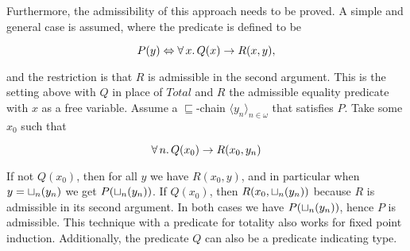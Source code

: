 Furthermore, the admissibility of this approach needs to be proved. A
simple and general case is assumed, where the predicate is defined to
be

$$P(y) \Leftrightarrow \forall \, x . \, Q(x) \rightarrow R(x,y),$$

\noindent
and the restriction is that $R$ is admissible in the second
argument. This is the setting above with $Q$ in place of $Total$ and
$R$ the admissible equality predicate with $x$ as a free
variable. Assume a $\sqsubseteq$-chain $\langle y_n
\rangle_{n\in\omega}$ that satisfies $P$. Take some $x_0$ such that

$$\forall \, n . \, Q(x_0) \rightarrow R(x_0,y_n)$$

If not $Q(x_0)$, then for all $y$ we have $R(x_0,y)$, and in
particular when $y=\sqcup_{n}(y_n)$ we get $P(\sqcup_{n}(y_n))$. If
$Q(x_0)$, then $R(x_0,\sqcup_{n}(y_n))$ because $R$ is admissible in its
second argument. In both cases we have $P(\sqcup_{n}(y_n))$, hence $P$
is admissible. This technique with a predicate for totality also works
for fixed point induction. Additionally, the predicate $Q$ can also be a
predicate indicating type.
